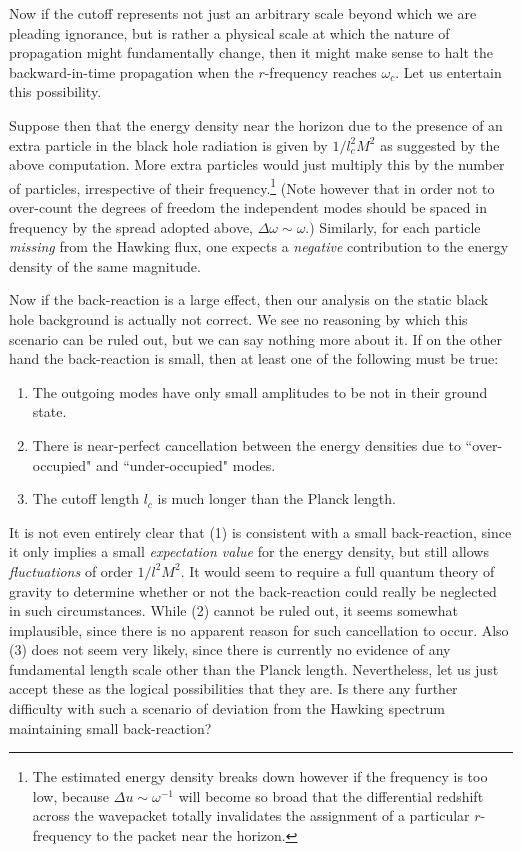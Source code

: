\documentclass[12pt]{article}
\def\o{\omega}
\begin{document}
Now if the cutoff represents not just an arbitrary scale
beyond which we are pleading ignorance, but is rather a
physical scale at which the nature of propagation might
fundamentally change, then it might make sense to halt the
backward-in-time propagation when the $r$-frequency reaches
$\o_c$. Let us entertain this possibility.

Suppose then that the energy density near the horizon due to
the presence of an extra particle in the black hole
radiation is given by $1/l_c^2M^2$ as suggested by the
above computation. More extra particles would just multiply
this by the number of particles, irrespective of their
frequency.\footnote{The estimated energy density breaks down
however if the frequency is too low, because $\Delta u\sim
\o^{-1}$ will become so broad that the differential redshift
across the wavepacket totally invalidates the assignment of
a particular $r$-frequency to the packet near the horizon.}
(Note however that in order not to over-count
the degrees of freedom the independent modes should be spaced in
frequency by the spread adopted above, $\Delta\o\sim\o$.)
Similarly, for each particle {\it missing} from the Hawking
flux, one expects a {\it negative} contribution to the
energy density of the same magnitude.

Now if the back-reaction is a large effect, then our
analysis on the static black hole background is actually not
correct. We see no reasoning by which this scenario can be
ruled out, but we can say nothing more about it.
If on the other hand the back-reaction is small, then at least one of the
following must be true:
\begin{enumerate}
\item The outgoing modes have only small amplitudes to
be not in their ground state.
\item There is near-perfect cancellation between the
energy densities due to ``over-occupied" and
``under-occupied" modes.
\item The cutoff length $l_c$ is much longer than the
Planck length.
\end{enumerate}

It is not even entirely clear that (1) is consistent with a small
back-reaction, since it only implies a small {\it expectation
value} for the energy density, but still allows {\it
fluctuations} of order $1/l^2M^2$. It would seem to require
a full quantum theory of gravity to determine whether or not the
back-reaction could really be neglected in such circumstances.
While (2) cannot be ruled out, it seems somewhat implausible,
since there is no apparent reason for such cancellation to
occur. Also (3) does not seem very likely,
since there is currently no evidence of any
fundamental length scale other than the Planck length.
Nevertheless, let us just accept
these as the logical possibilities that they are. Is there
any further difficulty with such a scenario of deviation
from the Hawking spectrum maintaining small back-reaction?
\end{document}
